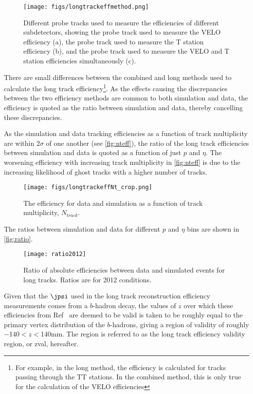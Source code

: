 \begin{figure}[h]
\centering
\texttt{[image: figs/longtrackeffmethod.png]}
\caption{Different probe tracks used to measure the efficiencies of different subdetectors, showing the probe track used to measure the VELO efficiency (a), the probe track used to measure the T station efficiency (b), and the probe track used to measure the VELO and T station efficiencies simultaneously (c).}
\label{fig:tracks}
\end{figure}

There are small differences between the combined and long methods used to calculate the long track efficiency\footnote{For example, in the long method, the efficiency is calculated for tracks passing through the TT stations. In the combined method, this is only true for the calculation of the VELO efficiencies}. As the effects causing the discrepancies between the two efficiency methods are common to both simulation and data, the efficiency is quoted as the ratio between simulation and data, thereby cancelling these discrepancies.


As the simulation and data tracking efficiencies as a function of track multiplicity are within 2$\sigma$ of one another (see \autoref{fig:nteff}), the ratio of the long track efficiencies between simulation and data is quoted as a function of just $p$ and $\eta$. The worsening efficiency with increasing track multiplicity in \autoref{fig:nteff} is due to the increasing likelihood of \gls{ghost} tracks with a higher number of tracks.
\begin{figure}[h]
\centering
\texttt{[image: figs/longtrackeffNt\_crop.png]}
\caption{The efficiency for data and simulation as a function of track multiplicity, $N_{track}$.}
\label{fig:nteff}
\end{figure}
The ratios between simulation and data for different $p$ and $\eta$ bins are shown in \autoref{fig:ratio}.
\begin{figure}[h]
\centering
\texttt{[image: ratio2012]}
\caption{Ratio of absolute efficiencies between data and simulated events for long tracks. Ratios are for 2012 conditions\cite{LHCB-DP-2013-002}.}%
\label{fig:ratio}
\end{figure}
Given that the $\jpsi$ used in the long track reconstruction efficiency measurements comes from a $b$-hadron decay, the values of $z$ over which these efficiencies from Ref~\cite{LHCB-DP-2013-002} are deemed to be valid is taken to be roughly equal to the primary vertex distribution of the $b$-hadrons, giving a region of validity of roughly $-$140$<z<$140\:mm. The region is referred to as the long track efficiency validity region, or \gls{zval}, hereafter.%

